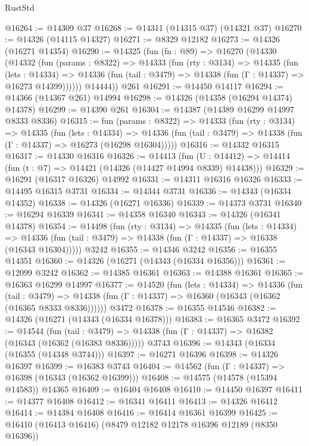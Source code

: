 \begin{lexlean}{RustStd}
\begin{coremodule}
@16264 := @14309 @37
@16268 := @14311 (@14315 @37) (@14321 @37)
@16270 := @14326 (@14115 @14327)
@16271 := @8329 @12182
@16273 := @14326 (@16271 @14354)
@16290 := @14325
    (fun (fn : @89) =>
    @16270
      (@14330
        (@14332
          (fun (params : @8322) =>
          @14333
            (fun (rty : @3134) =>
            @14335
              (fun (lets : @14334) =>
              @14336 (fun (tail : @3479) => @14338 (fun (Γ : @14337) => @16273 @14399))))))
        @14444))
    @261
@16291 := @14450 @14117
@16294 := @14366 (@14367 @261) @14994
@16298 := @14326 (@14358 (@16294 @14374) @14378)
@16299 := @14390 @261
@16304 := @14387 (@14389 @16299 @14997 @8333 @8336)
@16315 := fun (params : @8322) =>
  @14333
    (fun (rty : @3134) =>
    @14335
      (fun (lets : @14334) =>
      @14336 (fun (tail : @3479) => @14338 (fun (Γ : @14337) => @16273 (@16298 @16304)))))
@16316 := @14332 @16315
@16317 := @14330 @16316
@16326 := @14413
    (fun (U : @14412) => @14414 (fun (t : @7) => @14421 (@14326 (@14427 @14994 @8339) @14438)))
@16329 := @16291 (@16317 @16326) @14992
@16331 := @14311 @16316 @16326
@16333 := @14495 @16315 @3731
@16334 := @14344 @3731
@16336 := @14343 (@16334 @14352)
@16338 := @14326 (@16271 @16336)
@16339 := @14373 @3731
@16340 := @16294 @16339
@16341 := @14358 @16340
@16343 := @14326 (@16341 @14378)
@16354 := @14498
    (fun (rty : @3134) =>
    @14335
      (fun (lets : @14334) =>
      @14336 (fun (tail : @3479) => @14338 (fun (Γ : @14337) => @16338 (@16343 @16304)))))
    @3242
@16355 := @14346 @3242
@16356 := @16355 @14351
@16360 := @14326 (@16271 (@14343 (@16334 @16356)))
@16361 := @12099 @3242
@16362 := @14385 @16361
@16363 := @14388 @16361
@16365 := @16363 @16299 @14997
@16377 := @14520
    (fun (lets : @14334) =>
    @14336
      (fun (tail : @3479) =>
      @14338 (fun (Γ : @14337) => @16360 (@16343 (@16362 (@16365 @8333 @8336))))))
    @3472
@16378 := @16355 @14546
@16382 := @14326 (@16271 (@14343 (@16334 @16378)))
@16383 := @16365 @3472
@16392 := @14544
    (fun (tail : @3479) => @14338 (fun (Γ : @14337) => @16382 (@16343 (@16362 (@16383 @8336)))))
    @3743
@16396 := @14343 (@16334 (@16355 (@14348 @3744)))
@16397 := @16271 @16396
@16398 := @14326 @16397
@16399 := @16383 @3743
@16404 := @14562 (fun (Γ : @14337) => @16398 (@16343 (@16362 @16399)))
@16408 := @14575 (@14578 (@15394 @14583)) @14365
@16409 := @16404 @16408
@16410 := @14450 @16397
@16411 := @14377 @16408
@16412 := @16341 @16411
@16413 := @14326 @16412
@16414 := @14384 @16408
@16416 := @16414 @16361 @16399
@16425 := @16410 (@16413 @16416) (@8479 @12182 @12178 @16396 @12189 (@8350 @16396))

\end{coremodule}
\end{lexlean}
